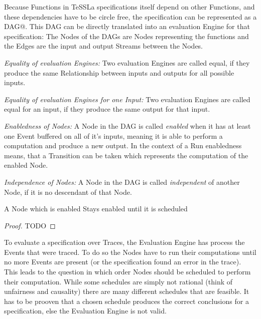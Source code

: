 Because Functions in TeSSLa specifications itself depend on other Functions, and these dependencies have to be circle free,
the specification can be represented as a DAG@.
This DAG can be directly translated into an evaluation Engine for that specification: The Nodes of the DAGs are Nodes representing the functions and the Edges are the input and output Streams between the Nodes.

\begin{definition}
  \emph{Equality of evaluation Engines:} Two evaluation Engines are called equal, if they produce the same Relationship between inputs and outputs for all possible inputs.
\label{def:equality_eval_engine}
\end{definition}

\begin{definition}
  \emph{Equality of evaluation Engines for one Input:} Two evaluation Engines are called equal for an input, if they produce the same output for that input.
\label{def:equality_eval_engine_specific}
\end{definition}

\begin{definition}
  \emph{Enabledness of Nodes:} A Node in the DAG is called \emph{enabled} when it has at least one Event buffered on all of it's inputs, meaning it is able to perform a computation and produce a new output.
  In the context of a Run enabledness means, that a Transition can be taken which represents the computation of the enabled Node.
\label{def:node_enabled}
\end{definition}

\begin{definition}
  \emph{Independence of Nodes:} A Node in the DAG is called \emph{independent} of another Node, if it is no descendant of that Node.
\label{def:node_independent}
\end{definition}

\begin{lemma}
  A Node which is enabled Stays enabled until it is scheduled
\label{lemma:enabled_till_scheduled}
\end{lemma}

\begin{proof}
TODO
\end{proof}


To evaluate a specification over Traces, the Evaluation Engine has process the Events that were traced.
To do so the Nodes have to run their computations until no more Events are present (or the specification found an error in the trace).
This leads to the question in which order Nodes should be scheduled to perform their computation.
While some schedules are simply not rational (think of unfairness and causality) there are many different schedules that are feasible.
It has to be prooven that a chosen schedule produces the correct conclusions for a specification, else the Evaluation Engine is not valid.

